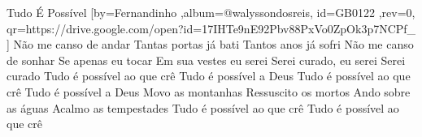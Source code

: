 \beginsong
{Tudo É Possível %
}[by={Fernandinho %
},album={@walyssondosreis},
id={GB0122 %
},rev={0}, %
qr={https://drive.google.com/open?id=17IHTe9nE92Pbv88PxVo0ZpOk3p7NCPf_ %
}]
\beginverse*
Não me canso de andar
Tantas portas já bati
Tantos anos já sofri
Não me canso de sonhar
Se apenas eu tocar
Em sua vestes eu serei
Serei curado, eu serei
Serei curado
\endverse
\beginchorus
Tudo é possível ao que crê
Tudo é possível a Deus
Tudo é possível ao que crê
Tudo é possível a Deus
\endchorus
\beginverse*
Movo as montanhas
Ressuscito os mortos
Ando sobre as águas
Acalmo as tempestades
Tudo é possível ao que crê
Tudo é possível ao que crê
\endverse

